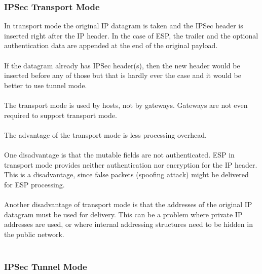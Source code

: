 \documentclass[10pt,a4paper]{article}
\begin{document}
\begin{itemize}
\begin{itemize}
\begin{itemize}
\subsubsection{IPSec Transport Mode}
In transport mode the original IP datagram is taken and the IPSec header is
inserted right after the IP header. In the
case of ESP, the trailer and the optional authentication data are appended at the
end of the original payload. 
\\
\\
If the datagram already has IPSec header(s), then the
new header would be inserted before any of those but that is hardly ever the case
and it would be better to use tunnel mode.
\\
\\
The transport mode is used by hosts, not by gateways. Gateways are not even
required to support transport mode.
\\
\\
The advantage of the transport mode is less processing overhead.
\\
\\
One disadvantage is that the mutable fields are not authenticated. ESP in
transport mode provides neither authentication nor encryption for the IP header.
This is a disadvantage, since false packets (spoofing attack) might be delivered
for ESP processing. 
\\
\\
Another disadvantage of transport mode is that the
addresses of the original IP datagram must be used for delivery. This can be a
problem where private IP addresses are used, or where internal addressing
structures need to be hidden in the public network.
\\
\\
\subsubsection{IPSec Tunnel Mode}




\end{itemize}
\end{itemize}
\end{itemize}
\end{document}
